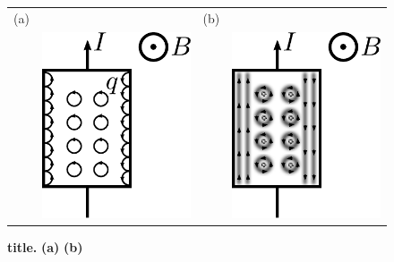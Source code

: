 \begin{figure}[hptb]
	\begin{center}
		\begin{tabular}{c c c c}
			(a) & & (b) & \\
			& \includegraphics[width = 4 cm]{./chap2/effet_Hall_semi_classique} &
			& \includegraphics[width = 4 cm]{./chap2/effet_Hall_quantique}
		\end{tabular}
	\end{center}
	
	\caption{\textbf{title.} \textbf{(a)}  \textbf{(b)}}
	\label{fig: effet Hall quantique}
\end{figure}

